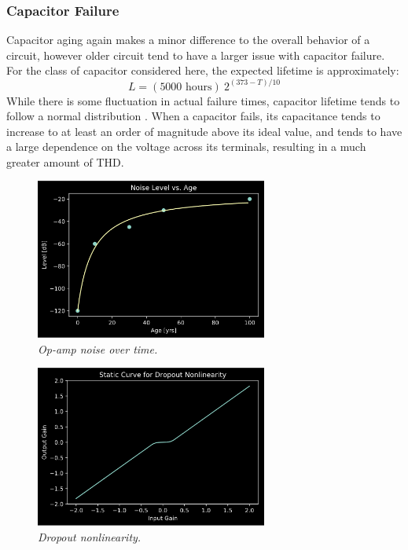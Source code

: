 \documentclass[twoside,a4paper]{article}
\begin{document}
\subsubsection{Capacitor Failure} \label{sec:cap-fail}
%
Capacitor aging again makes a minor difference to the overall behavior
of a circuit, however older circuit tend to have a larger issue with
capacitor failure. For the class of capacitor considered here, the
expected lifetime is approximately:
%
\begin{equation}
    L = (5000 \text{ hours})\ 2^{(373 - T) / 10}
    \label{eq:cap-fail}
\end{equation}
%
While there is some fluctuation in actual failure times, capacitor
lifetime tends to follow a normal distribution \cite{cap-fail}. When
a capacitor fails, its capacitance tends to increase to at least an
order of magnitude above its ideal value, and tends to have a large
dependence on the voltage across its terminals, resulting in a much
greater amount of THD.
%
\begin{figure}[h]
    \center
    \includegraphics[width=3in]{../OpAmp/Pics/age_noise.png}
    \caption{\label{opamp-age-noise}{\it Op-amp noise over time.}}
\end{figure}
%
\begin{figure}[h]
    \center
    \includegraphics[width=3in]{Pics/dropout.png}
    \caption{\label{dropout}{\it Dropout nonlinearity.}}
\end{figure}
%
\end{document}

